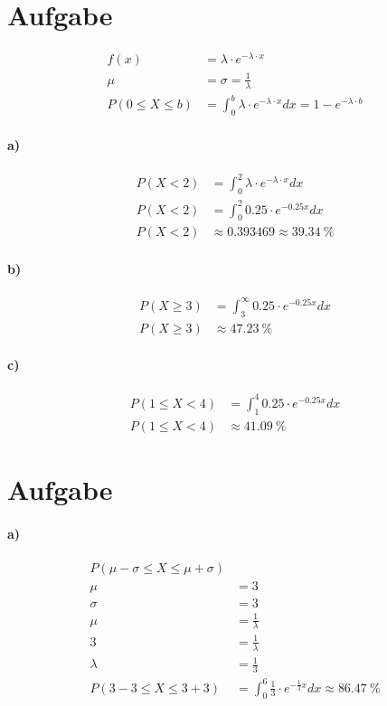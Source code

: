 \documentclass[12pt,a4paper]{report}
\begin{document}
	\section{Aufgabe}
	\begin{align*}
		f(x) &= \lambda \cdot e^{-\lambda\cdot x} \\
		\mu &= \sigma = \frac{1}{\lambda} \\
		P(0 \leq X \leq b) &= \int_{0}^b \lambda \cdot e^{-\lambda\cdot x} dx = 1 - e^{-\lambda \cdot b} 
	\end{align*}
	\paragraph{a)}
	\begin{align*}
		P(X < 2) &= \int_{0}^{2} \lambda \cdot e^{-\lambda \cdot x} dx \\
		P(X < 2) &= \int_{0}^{2} 0.25 \cdot e^{-0.25x} dx \\
		P(X < 2) &\approx 0.393469 \approx 39.34\ \%
	\end{align*}
	\paragraph{b)}
	\begin{align*}
		P(X \geq 3) &= \int_{3}^{\infty} 0.25 \cdot e^{-0.25x} dx \\
		P(X \geq 3) &\approx 47.23 \ \%
	\end{align*}
	\paragraph{c)}
	\begin{align*}
		P(1 \leq X < 4) &= \int_{1}^{4} 0.25 \cdot e^{-0.25x} dx \\
		P(1 \leq X < 4) &\approx 41.09\ \%
	\end{align*}
	\section{Aufgabe}
	\paragraph{a)}
	\begin{align*}
		P(\mu - \sigma \leq X \leq \mu + \sigma) \\
		\mu &= 3\\
		\sigma &= 3 \\
		\mu &= \frac{1}{\lambda} \\
		3 &= \frac{1}{\lambda} \\
		\lambda &= \frac{1}{3} \\
		P(3 - 3 \leq X \leq 3 + 3) &= \int_0^6 \frac{1}{3} \cdot e^{-\frac{1}{3}x} dx \approx 86.47\ \% \\
	\end{align*}
\end{document}
